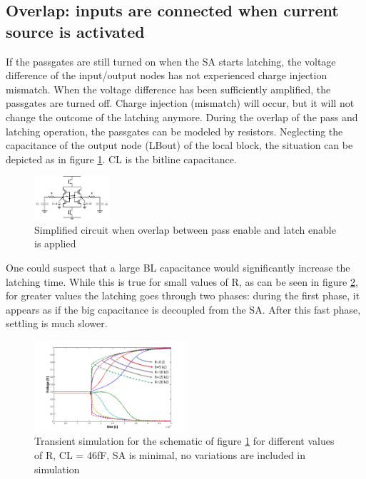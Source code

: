 \documentclass[journal]{IEEEtran}
\begin{document}
\subsection{Overlap: inputs are connected when current source is activated}
If the passgates are still turned on when the SA starts latching, the voltage difference of the input/output nodes has not experienced charge injection mismatch. When the voltage difference has been sufficiently amplified, the passgates are turned off. Charge injection (mismatch) will occur, but it will not change the outcome of the latching anymore. During the overlap of the pass and latching operation, the passgates can be modeled by resistors. Neglecting the capacitance of the output node (LBout) of the local block, the situation can be depicted as in figure \ref{fig:RC-latch}. CL is the bitline capacitance.

\begin{figure}[ht!]
  \centering
  \includegraphics[width=0.25\textwidth]{../fig/hfdstk-sensamp-RC-latch.png}
  \caption{Simplified circuit when overlap between pass enable and latch enable is applied}
  \label{fig:RC-latch}
\end{figure}

One could suspect that a large BL capacitance would significantly increase the latching time. While this is true for small values of R, as can be seen in figure \ref{fig:RC-latch-sim}, for greater values the latching goes through two phases: during the first phase, it appears as if the big capacitance is decoupled from the SA. After this fast phase, settling is much slower. 

\begin{figure}[ht!]
  \centering
  \includegraphics[width=0.5\textwidth]{../fig/hfdstk-sensamp-RC-latch-sim.png}
  \caption{Transient simulation for the schematic of figure \ref{fig:RC-latch} for different values of R, CL = 46fF, SA is minimal, no variations are included in simulation}
  \label{fig:RC-latch-sim}
\end{figure}
\end{document}
